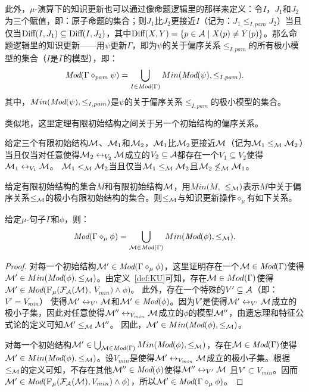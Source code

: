 此外，$\mu$-演算下的知识更新也可以通过像命题逻辑里的那样来定义：令$I$，$J_1$和$J_2$为三个赋值，即：原子命题的集合；则$J_1$比$J_2$更接近$I$（记为：$J_1 \leq_{I,pam} J_2$）当且仅当$\textrm{Diff}(I, J_1) \subseteq \textrm{Diff}(I, J_2)$，其中$\textrm{Diff}(X, Y) =\{p\in {\cal A} \mid X(p) \not = Y(p)\}$。那么命题逻辑里的知识更新——用$\psi$更新$\Gamma$，即为$\psi$的关于偏序关系$\leq_{I,pam}$的所有极小模型的集合（$I$是$\Gamma$的模型），即：
$$\textit{Mod}(\Gamma \diamond_{pam} \psi) = \bigcup_{I \in \textit{Mod}(\Gamma)} Min(\textit{Mod}(\psi), \leq_{I,pam}).$$
其中，$Min(\textit{Mod}(\psi), \leq_{I,pam})$是$\psi$的关于偏序关系$\leq_{I,pam}$的极小模型的集合。

类似地，这里定理有限初始结构之间关于另一个初始结构的偏序关系。
\begin{definition}\label{def:closer}
	给定三个有限初始结构${\cal M}$、${\cal M}_1$和${\cal M}_2$，${\cal M}_1$比${\cal M}_2$更接近${\cal M}$（记为${\cal M}_1 \leq_{{\cal M}} {\cal M}_2$）当且仅当对任意使得${\cal M}_2 \leftrightarrow_{V_2} {\cal M}$成立的$V_2 \subseteq \mathcal{A}$都存在一个$V_1 \subseteq V_2$使得${\cal M}_1 \leftrightarrow_{V_1} {\cal M}$。
	 ${\cal M}_1 <_{{\cal M}} {\cal M}_2$当且仅当${\cal M}_1 \leq_{{\cal M}} {\cal M}_2$且${\cal M}_2 \not \leq_{{\cal M}} {\cal M}_1$。
\end{definition}

给定有限初始结构的集合$M$和有限初始结构${\cal M}$，用$Min(M,$ $\leq_{{\cal M}})$表示$M$中关于偏序关系$\leq_{{\cal M}}$的极小有限初始结构的集合。则$\leq_{{\cal M}}$与知识更新操作$\diamond_{\mu}$有如下关系。

\begin{theorem}\label{thm:minU}
	给定$\mu$-句子$\Gamma$和$\phi$，则：
	\[\textit{Mod}(\Gamma \diamond_{\mu} \phi) = \bigcup_{{\cal M}\in \textit{Mod}(\Gamma)} Min(\textit{Mod}(\phi), \leq_{{\cal M}}).
	\]
\end{theorem}
\begin{proof}
	对每一个初始结构${\cal M}'\in \textit{Mod}(\Gamma \diamond_{\mu} \phi)$，这里证明存在一个${\cal M} \in \textit{Mod}(\Gamma)$使得${\cal M}' \in  Min(\textit{Mod}(\phi), \leq_{{\cal M}})$。由定义~\ref{def:KU}可知，存在${\cal M}\in Mod(\Gamma)$使得${\cal M}'\in \textit{Mod}({\textsc{F}_{\textsc{$\mu$}}}({\cal F}_{{\cal A}}({\cal M})$, $V_{min}) \wedge \phi)$。 此外，存在一个特殊的$V'\subseteq {\cal A}$（即：$V' = V_{min}$） 使得${\cal M}' \leftrightarrow_{V'} {\cal M}$和${\cal M}' \in \textit{Mod}(\phi)$。因为$V'$是使得${\cal M}' \leftrightarrow_{V'} {\cal M}$成立的极小子集，因此对任意使得${\cal M}'' \leftrightarrow_{V_{min}} {\cal M}$成立的$\phi$的模型${\cal M}''$，由遗忘理和特征公式论的定义可知${\cal M}' \leq_{{\cal M}} {\cal M}''$。 因此，${\cal M}' \in Min(\textit{Mod}(\phi), \leq_{{\cal M}})$。
	
	对每一个初始结构${\cal M}'\in \bigcup_{{\cal M}\in \textit{Mod}(\Gamma)} Min(\textit{Mod}(\phi), \leq_{{\cal M}})$，存在${\cal M} \in \textit{Mod}(\Gamma)$使得${\cal M}' \in  Min(\textit{Mod}(\phi), \leq_{{\cal M}})$。设$V_{min}$是使得${\cal M}' \leftrightarrow_{V_{min}} {\cal M}$成立的极小子集。根据$\leq_{{\cal M}}$的定义可知，不存在其他${\cal M}''\in \textit{Mod}(\phi)$使得${\cal M}'' \leftrightarrow_{V'} {\cal M}$ 且$V' \subset V_{min}$。因而${\cal M}' \in \textit{Mod}({\textsc{F}_{\textsc{$\mu$}}}({\cal F}_{{\cal A}}({\cal M}), V_{min}) \wedge \phi)$，所以${\cal M}' \in \textit{Mod}(\Gamma \diamond_{\mu} \phi)$。
\end{proof}

